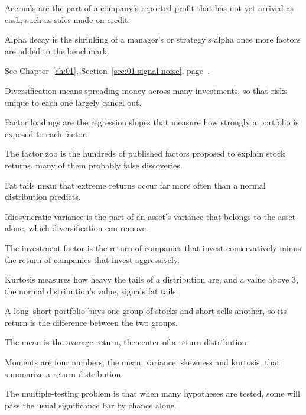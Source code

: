 \begin{keyterms}
\footnotesize
\begin{description}[leftmargin=0pt, itemsep=0pt, parsep=0pt, topsep=0pt, font=\normalfont\bfseries\color{FEMaroon}]
  \item[Accruals.] Accruals are the part of a company's reported profit that has not yet arrived as cash, such as sales made on credit.
  \item[Alpha decay.] Alpha decay is the shrinking of a manager's or strategy's alpha once more factors are added to the benchmark.
  \item[Autocorrelation.] See Chapter~\ref{ch:01}, Section~\ref{sec:01-signal-noise}, page~\pageref{kt:autocorrelated}.
  \item[Diversification.] Diversification means spreading money across many investments, so that risks unique to each one largely cancel out.
  \item[Factor loadings.] Factor loadings are the regression slopes that measure how strongly a portfolio is exposed to each factor.
  \item[Factor zoo.] The factor zoo is the hundreds of published factors proposed to explain stock returns, many of them probably false discoveries.
  \item[Fat tails.] Fat tails mean that extreme returns occur far more often than a normal distribution predicts.
  \item[Idiosyncratic variance.] Idiosyncratic variance is the part of an asset's variance that belongs to the asset alone, which diversification can remove.
  \item[Investment factor.] The investment factor is the return of companies that invest conservatively minus the return of companies that invest aggressively.
  \item[Kurtosis.] Kurtosis measures how heavy the tails of a distribution are, and a value above 3, the normal distribution's value, signals fat tails.
  \item[Long--short portfolio.] A long--short portfolio buys one group of stocks and short-sells another, so its return is the difference between the two groups.
  \item[Mean.] The mean is the average return, the center of a return distribution.
  \item[Moments.] Moments are four numbers, the mean, variance, skewness and kurtosis, that summarize a return distribution.
  \item[Multiple-testing problem.] The multiple-testing problem is that when many hypotheses are tested, some will pass the usual significance bar by chance alone.

\end{description}
\end{keyterms}
